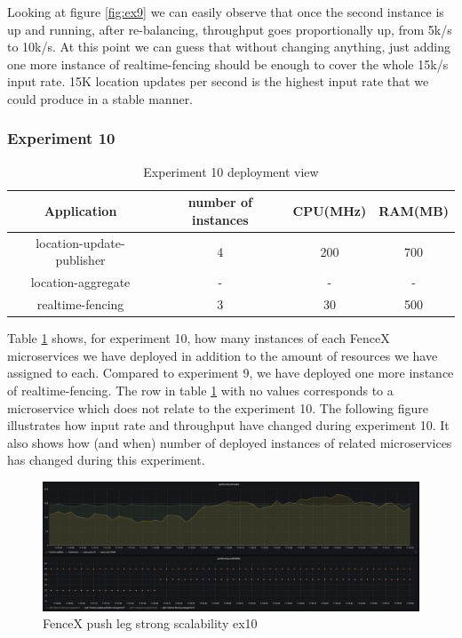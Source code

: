 \documentclass[a4]{report}
\begin{document}
    Looking at figure \ref{fig:ex9} we can easily observe that once the second instance is up and running, after
    re-balancing, throughput goes proportionally up, from 5k/s to 10k/s.
    At this point we can guess that without changing anything, just adding one more instance of realtime-fencing
    should be enough to cover the whole 15k/s input rate.
    15K location updates per second is the highest input rate that we could produce in a stable manner.

    \clearpage

    \subsubsection{Experiment 10}
    \begin{table}[h!]
        \centering
        \begin{tabular}{|c|c|c|c|}
            \hline
            Application               & number of instances & CPU(MHz) & RAM(MB) \\
            \hline
            location-update-publisher & 4                   & 200      & 700     \\
            location-aggregate        & -                   & -        & -       \\
            realtime-fencing          & 3                   & 30       & 500     \\
            \hline
        \end{tabular}
        \caption{Experiment 10 deployment view}
        \label{table:ex10-dv}
    \end{table}

    Table \ref{table:ex10-dv} shows, for experiment 10, how many instances of each FenceX microservices we have
    deployed in addition to the amount of resources we have assigned to each.
    Compared to experiment 9, we have deployed one more instance of realtime-fencing.
    The row in table \ref{table:ex10-dv} with no values corresponds to a microservice which does not relate to the experiment 10.
    The following figure illustrates how input rate and throughput have changed during experiment 10.
    It also shows how (and when) number of deployed instances of related microservices has changed during this
    experiment.

    \begin{figure}[h!]
        \centering
        \caption{FenceX push leg strong scalability ex10}
        \label{fig:ex10}
        \includegraphics[width=\linewidth, scale=2]{images/evaluation/ex10-benchmarking-ongoing-2per4sec.png}
    \end{figure}
\end{document}
